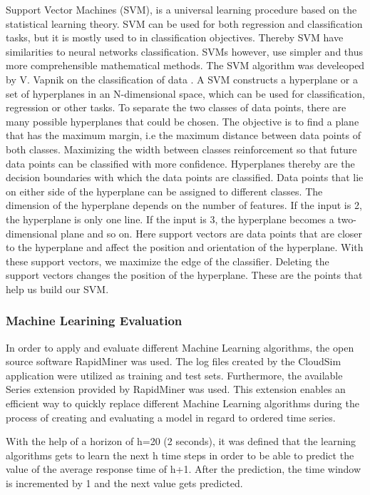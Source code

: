 Support Vector Machines (SVM), is a universal learning procedure based on the statistical learning theory. SVM can be used for both regression and classification tasks, but it is mostly used to in classification objectives. Thereby SVM have similarities to neural networks classification. SVMs however, use simpler and thus more comprehensible mathematical methods. The SVM algorithm was develeoped by V. Vapnik on the classification of data  \cite{Cortes:1995:SN:218919.218929}  \cite{Vapnik:1995:NSL:211359}.
A SVM constructs a hyperplane or a set of hyperplanes in an N-dimensional space, which can be used for classification, regression or other tasks. To separate the two classes of data points, there are many possible hyperplanes that could be chosen. The objective is to find a plane that has the maximum margin, i.e the maximum distance between data points of both classes. Maximizing the width between classes reinforcement so that future data points can be classified with more confidence. Hyperplanes thereby are the decision boundaries with which the data points are classified. Data points that lie on either side of the hyperplane can be assigned to different classes. The dimension of the hyperplane depends on the number of features. If the input is 2, the hyperplane is only one line. If the input is 3, the hyperplane becomes a two-dimensional plane and so on. Here support vectors are data points that are closer to the hyperplane and affect the position and orientation of the hyperplane. With these support vectors, we maximize the edge of the classifier. Deleting the support vectors changes the position of the hyperplane. These are the points that help us build our SVM.

\subsubsection{Machine Learining Evaluation}\label{MLeval}
In order to apply and evaluate different Machine Learning algorithms, the open source software RapidMiner  \cite{rapidminer} was used. The log files created by the CloudSim application were utilized as training and test sets. Furthermore, the available Series extension provided by RapidMiner was used. This extension enables an efficient way to quickly replace different Machine Learning algorithms during the process of creating and evaluating a model in regard to ordered time series.

With the help of a horizon of h=20 (2 seconds), it was defined that the learning algorithms gets to learn the next h time steps in order to be able to predict the value of the average response time of h+1. After the prediction, the time window is incremented by 1 and the next value gets predicted. 

